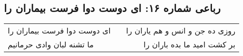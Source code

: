\begin{center}
\section*{رباعی شماره ۱۶: ای دوست دوا فرست بیماران را}
\label{sec:sh016}
\begin{longtable}{l p{0.5cm} r}
ای دوست دوا فرست بیماران را
&&
روزی ده جن و انس و هم یاران را
\\
ما تشنه لبان وادی حرمانیم
&&
بر کشت امید ما بده باران را
\\
\end{longtable}
\end{center}
